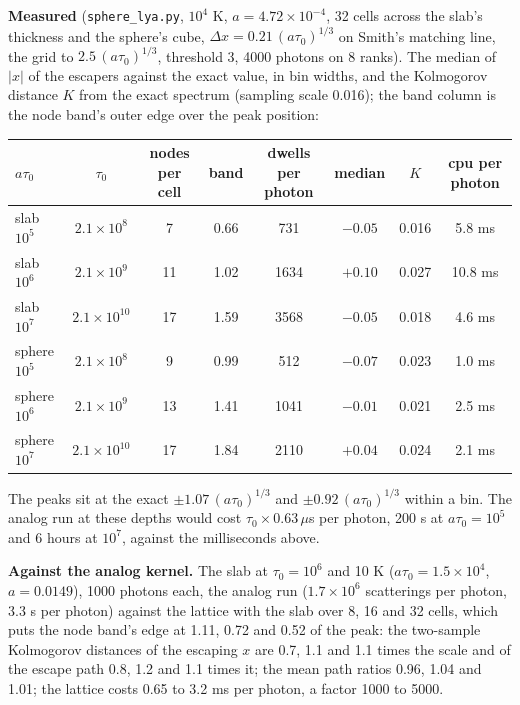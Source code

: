 \documentclass[11pt]{article}
\begin{document}
\textbf{Measured} (\texttt{sphere\_lya.py}, $10^4$ K, $a = 4.72\times10^{-4}$, 32
cells across the slab's thickness and the sphere's cube, $\Delta x = 0.21\,(a\tau_0)^{1/3}$
on Smith's matching line, the grid to $2.5\,(a\tau_0)^{1/3}$, threshold 3, 4000
photons on 8 ranks).  The median of $|x|$ of the escapers against the exact value, in
bin widths, and the Kolmogorov distance $K$ from the exact spectrum (sampling scale
0.016); the band column is the node band's outer edge over the peak position:
\begin{center}
\begin{tabular}{lccccccc}
$a\tau_0$ & $\tau_0$ & nodes per cell & band & dwells per photon & median & $K$ & cpu per photon \\
\hline
slab $10^5$ & $2.1\times10^8$ & 7 & 0.66 & 731 & $-0.05$ & 0.016 & 5.8 ms \\
slab $10^6$ & $2.1\times10^9$ & 11 & 1.02 & 1634 & $+0.10$ & 0.027 & 10.8 ms \\
slab $10^7$ & $2.1\times10^{10}$ & 17 & 1.59 & 3568 & $-0.05$ & 0.018 & 4.6 ms \\
sphere $10^5$ & $2.1\times10^8$ & 9 & 0.99 & 512 & $-0.07$ & 0.023 & 1.0 ms \\
sphere $10^6$ & $2.1\times10^9$ & 13 & 1.41 & 1041 & $-0.01$ & 0.021 & 2.5 ms \\
sphere $10^7$ & $2.1\times10^{10}$ & 17 & 1.84 & 2110 & $+0.04$ & 0.024 & 2.1 ms \\
\end{tabular}
\end{center}
The peaks sit at the exact $\pm1.07\,(a\tau_0)^{1/3}$ and $\pm0.92\,(a\tau_0)^{1/3}$
within a bin.  The analog run at these depths would cost $\tau_0 \times 0.63\,\mu$s per
photon, 200 s at $a\tau_0 = 10^5$ and 6 hours at $10^7$, against the milliseconds
above.

\textbf{Against the analog kernel.}  The slab at $\tau_0 = 10^6$ and 10 K ($a\tau_0 =
1.5\times10^4$, $a = 0.0149$), 1000 photons each, the analog run ($1.7\times10^6$
scatterings per photon, 3.3 s per photon) against the lattice with the slab over 8,
16 and 32 cells, which puts the node band's edge at 1.11, 0.72 and 0.52 of the peak:
the two-sample Kolmogorov distances of the escaping $x$ are 0.7, 1.1 and 1.1 times
the scale and of the escape path 0.8, 1.2 and 1.1 times it; the mean path ratios 0.96,
1.04 and 1.01; the lattice costs 0.65 to 3.2 ms per photon, a factor 1000 to 5000.
\end{document}
